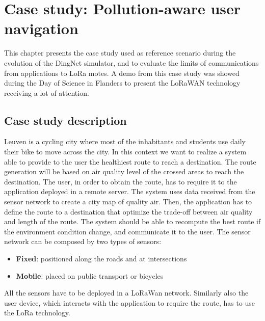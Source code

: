\chapter{Case study: Pollution-aware user navigation}
\label{chap:case-staudyLoRa}

This chapter presents the case study used as reference scenario during the evolution of the DingNet simulator, and to evaluate the limits of communications from applications to LoRa motes. 
A demo from this case study was showed during the Day of Science in Flanders to present the LoRaWAN technology receiving a lot of attention.

\section{Case study description}
Leuven is a cycling city where most of the inhabitants and students use daily their bike to move across the city. 
In this context we want to realize a system able to provide to the user the healthiest route to reach a destination. 
The route generation will be based on air quality level of the crossed areas to reach the destination. 
The user, in order to obtain the route, has to require it to the application deployed in a remote server.
The system uses data received from the sensor network to create a city map of quality air.
Then, the application has to define the route to a destination that optimize the trade-off between air quality and length of the route.
The system should be able to recompute the best route if the environment condition change, and communicate it to the user.
The sensor network can be composed by two types of sensors:
\begin{itemize}
    \item \textbf{Fixed}: positioned along the roads and at intersections
    \item \textbf{Mobile}: placed on public transport or bicycles
\end{itemize}
All the sensors have to be deployed in a LoRaWan network.
Similarly also the user device, which interacts with the application to require the route, has to use the LoRa technology.

